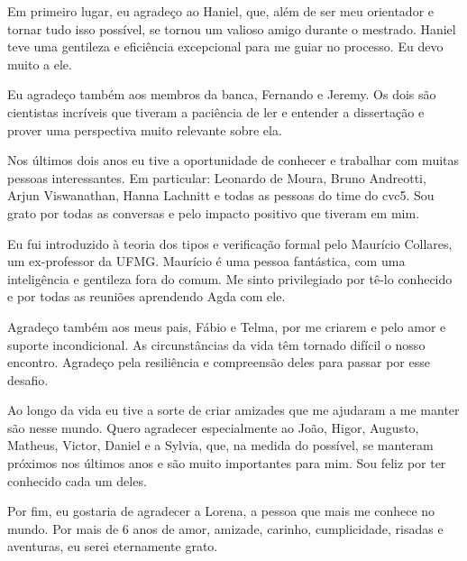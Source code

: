 Em primeiro lugar, eu agradeço ao Haniel, que, além de ser meu orientador e tornar tudo isso possível, se tornou um valioso amigo durante o mestrado. Haniel teve uma gentileza e eficiência excepcional para me guiar no processo. Eu devo muito a ele.

Eu agradeço também aos membros da banca, Fernando e Jeremy. Os dois são cientistas incríveis que tiveram a paciência de ler e entender a dissertação e prover uma perspectiva muito relevante sobre ela.

Nos últimos dois anos eu tive a oportunidade de conhecer e trabalhar com muitas pessoas interessantes. Em particular: Leonardo de Moura, Bruno Andreotti, Arjun Viswanathan, Hanna Lachnitt e todas as pessoas do time do cvc5. Sou grato por todas as conversas e pelo impacto positivo que tiveram em mim.

Eu fui introduzido à teoria dos tipos e verificação formal pelo Maurício Collares, um ex-professor da UFMG. Maurício é uma pessoa fantástica, com uma inteligência e gentileza fora do comum. Me sinto privilegiado por tê-lo conhecido e por todas as reuniões aprendendo Agda com ele.

Agradeço também aos meus pais, Fábio e Telma, por me criarem e pelo amor e suporte incondicional. As circunstâncias da vida têm tornado difícil o nosso encontro. Agradeço pela resiliência e compreensão deles para passar por esse desafio.

Ao longo da vida eu tive a sorte de criar amizades que me ajudaram a me manter são nesse mundo. Quero agradecer especialmente ao João, Higor, Augusto, Matheus, Victor, Daniel e a Sylvia, que, na medida do possível, se manteram próximos nos últimos anos e são muito importantes para mim. Sou feliz por ter conhecido cada um deles.

Por fim, eu gostaria de agradecer a Lorena, a pessoa que mais me conhece no mundo. Por mais de 6 anos de amor, amizade, carinho, cumplicidade, risadas e aventuras, eu serei eternamente grato.
